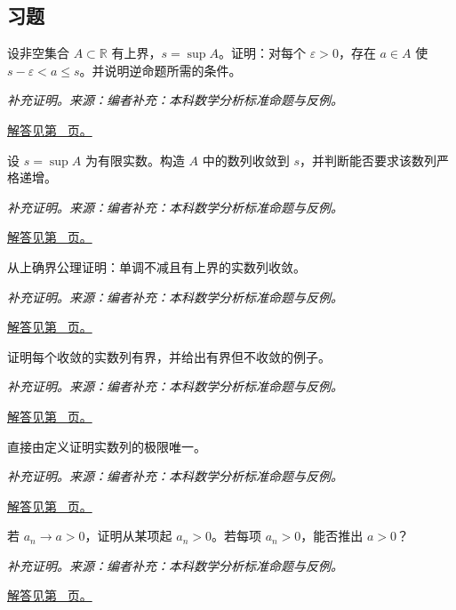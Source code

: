 \documentclass[12pt,fontset=fandol]{ctexart}
\begin{document}
\subsection{习题}
\begin{example}[上确界的逼近性质]\label{ex:c2q1}
设非空集合 $A\subset\mathbb R$ 有上界，$s=\sup A$。证明：对每个 $\varepsilon>0$，存在 $a\in A$ 使 $s-\varepsilon<a\le s$。并说明逆命题所需的条件。
\par\textit{补充证明。来源：编者补充：本科数学分析标准命题与反例。}\par\hyperref[ans:c2q1]{解答见第~\pageref{ans:c2q1} 页。}
\end{example}
\begin{example}[从上确界构造逼近数列]\label{ex:c2q2}
设 $s=\sup A$ 为有限实数。构造 $A$ 中的数列收敛到 $s$，并判断能否要求该数列严格递增。
\par\textit{补充证明。来源：编者补充：本科数学分析标准命题与反例。}\par\hyperref[ans:c2q2]{解答见第~\pageref{ans:c2q2} 页。}
\end{example}
\begin{example}[单调有界定理的证明]\label{ex:c2q3}
从上确界公理证明：单调不减且有上界的实数列收敛。
\par\textit{补充证明。来源：编者补充：本科数学分析标准命题与反例。}\par\hyperref[ans:c2q3]{解答见第~\pageref{ans:c2q3} 页。}
\end{example}
\begin{example}[收敛数列有界]\label{ex:c2q4}
证明每个收敛的实数列有界，并给出有界但不收敛的例子。
\par\textit{补充证明。来源：编者补充：本科数学分析标准命题与反例。}\par\hyperref[ans:c2q4]{解答见第~\pageref{ans:c2q4} 页。}
\end{example}
\begin{example}[极限的唯一性]\label{ex:c2q5}
直接由定义证明实数列的极限唯一。
\par\textit{补充证明。来源：编者补充：本科数学分析标准命题与反例。}\par\hyperref[ans:c2q5]{解答见第~\pageref{ans:c2q5} 页。}
\end{example}
\begin{example}[保号性与严格不等式]\label{ex:c2q6}
若 $a_n\to a>0$，证明从某项起 $a_n>0$。若每项 $a_n>0$，能否推出 $a>0$？
\par\textit{补充证明。来源：编者补充：本科数学分析标准命题与反例。}\par\hyperref[ans:c2q6]{解答见第~\pageref{ans:c2q6} 页。}
\end{example}
\end{document}
